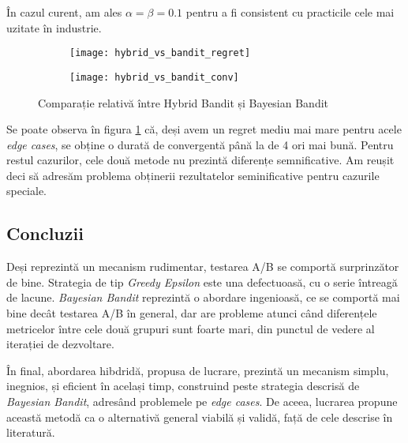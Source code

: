 În cazul curent, am ales $\alpha = \beta = 0.1$ pentru a fi consistent cu practicile cele mai uzitate în industrie.

\begin{figure}[H]
	\centering
	\begin{subfigure}{.5\textwidth}
		\centering
		\texttt{[image: hybrid\_vs\_bandit\_regret]}
	\end{subfigure}%
	\begin{subfigure}{.5\textwidth}
		\centering
		\texttt{[image: hybrid\_vs\_bandit\_conv]}
	\end{subfigure}
	\caption{Comparație relativă între Hybrid Bandit și Bayesian Bandit}
	\label{fig:hybrid_vs_bayesian}
\end{figure}

Se poate observa în figura \ref{fig:hybrid_vs_bayesian} că, deși avem un regret mediu mai mare pentru acele \textit{edge cases}, se obține o durată de convergentă până la de 4 ori mai bună. Pentru restul cazurilor, cele două metode nu prezintă diferențe semnificative. Am reușit deci să adresăm problema obținerii rezultatelor seminificative pentru cazurile speciale.

\subsection{Concluzii}

Deși reprezintă un mecanism rudimentar, testarea A/B se comportă surprinzător de bine. Strategia de tip \textit{Greedy Epsilon} este una defectuoasă, cu o serie întreagă de lacune. \textit{Bayesian Bandit} reprezintă o abordare ingenioasă, ce se comportă mai bine decât testarea A/B în general, dar are probleme atunci când diferențele metricelor între cele două grupuri sunt foarte mari, din punctul de vedere al iterației de dezvoltare. 

În final, abordarea hibdridă, propusa de lucrare, prezintă un mecanism simplu, inegnios, și eficient în același timp, construind peste strategia descrisă de \textit{Bayesian Bandit}, adresând problemele pe \textit{edge cases}. De aceea, lucrarea propune această metodă ca o alternativă general viabilă și validă, față de cele descrise în literatură.


